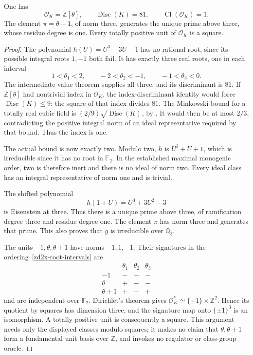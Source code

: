 \begin{lemma}
\label{zd2x-field}
One has
\[
 \mathcal O_K=\mathbb Z[\theta],\qquad
 \operatorname{Disc}(K)=81,\qquad
 \operatorname{Cl}(\mathcal O_K)=1.
\]
The element \(\pi=\theta-1\), of norm three, generates the unique
prime above three, whose residue degree is one. Every totally
positive unit of \(\mathcal O_K\) is a square.
\end{lemma}
\begin{proof}
The polynomial \(h(U)=U^3-3U-1\) has no rational root, since its
possible integral roots \(1,-1\) both fail. It has exactly three
real roots, one in each interval
\begin{equation}
 1<\theta_1<2,\qquad -2<\theta_2<-1,\qquad -1<\theta_3<0.
 \label{zd2x-root-intervals}
\end{equation}
The intermediate value theorem supplies all three, and its
discriminant is \(81\). If \(\mathbb Z[\theta]\) had nontrivial
index in \(\mathcal O_K\), the index-discriminant identity
would force \(\operatorname{Disc}(K)\le9\): the square of that
index divides \(81\). The Minkowski bound for a totally real
cubic field is \((2/9)\sqrt{\operatorname{Disc}(K)}\), by
\cite[Theorem~4.3]{MilneANT2020}. It would then be at most
\(2/3\), contradicting the positive integral norm of an ideal
representative required by that bound. Thus the index is one.

The actual bound is now exactly two. Modulo two, \(h\) is
\(U^3+U+1\), which is irreducible since it has no root in
\(\mathbb F_2\). In the established maximal monogenic order,
two is therefore inert and there is no ideal of norm two.
Every ideal class has an integral representative of norm one
and is trivial.

The shifted polynomial
\[
 h(1+U)=U^3+3U^2-3
\]
is Eisenstein at three. Thus there is a unique prime above
three, of ramification degree three and residue degree one.
The element \(\pi\) has norm three and generates that prime.
This also proves that \(g\) is irreducible over \(\mathbb Q_3\).

The units \(-1,\theta,\theta+1\) have norms \(-1,1,-1\).
Their signatures in the ordering~\eqref{zd2x-root-intervals}
are
\begin{equation}
 \begin{array}{c|ccc}
  &\theta_1&\theta_2&\theta_3\\ \hline
  -1&-&-&-\\
  \theta&+&-&-\\
  \theta+1&+&-&+
 \end{array}
 \label{zd2x-unit-signatures}
\end{equation}
and are independent over \(\mathbb F_2\).
Dirichlet's theorem \cite[Theorem~5.1]{MilneANT2020} gives
\(\mathcal O_K^*\simeq\{\pm1\}\times\mathbb Z^2\).
Hence its quotient by squares has dimension three, and the
signature map onto \(\{\pm1\}^3\) is an isomorphism. A totally
positive unit is consequently a square. This argument needs
only the displayed classes modulo squares; it makes no claim
that \(\theta,\theta+1\) form a fundamental unit basis over
\(\mathbb Z\), and invokes no regulator or class-group oracle.
\end{proof}

